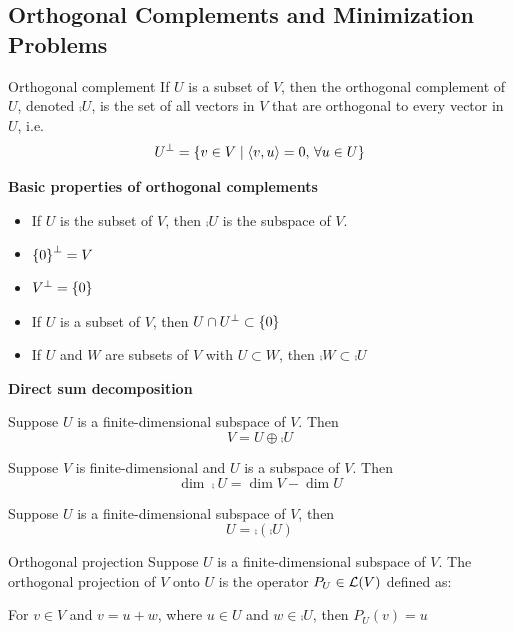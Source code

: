 \documentclass[12pt,a4paper]{article}
\begin{document}
    \subsection{Orthogonal Complements and Minimization Problems}
    \begin{defi}{Orthogonal complement}%
        If $U$ is a subset of $V$, then the orthogonal complement of $U$, denoted $\comp{U}$, is the set of all vectors in $V$ that are orthogonal to every vector in $U$, i.e.
        $$
        U^{\perp}=\left\{v\in V\mid\langle v,u\rangle=0,\,\forall u\in U\right\}
        $$
    \end{defi}
    \hfill

    \begin{prop}
        \textbf{Basic properties of orthogonal complements}
        \begin{itemize}
            \item If $U$ is the subset of $V$, then $\comp{U}$ is the subspace of $V$.
            \item $\left\{0\right\}^{\perp}=V$
            \item $V^{\perp}=\left\{0\right\}$
            \item If $U$ is a subset of $V$, then $U\cap U^{\perp}\subset\left\{0\right\}$
            \item If $U$ and $W$ are subsets of $V$ with $U\subset W$, then $\comp{W}\subset{\comp{U}}$
        \end{itemize}
    \end{prop}
    \hfill

    \begin{prop}
        \textbf{Direct sum decomposition}

        Suppose $U$ is a finite-dimensional subspace of $V$. Then
        $$
        V=U\oplus\comp{U}
        $$
    \end{prop}
    \hfill

    \begin{prop}\label{6.29}
        Suppose $V$ is finite-dimensional and $U$ is a subspace of $V$. Then 
        $$
        \dim\comp{U}=\dim V-\dim U
        $$
    \end{prop}
    \hfill

    \begin{prop}
        Suppose $U$ is a finite-dimensional subspace of $V$, then
        $$
        U=\comp{(\comp{U})}
        $$
    \end{prop}
    \hfill

    \begin{defi}{Orthogonal projection}%
        Suppose $U$ is a finite-dimensional subspace of $V$. The orthogonal projection of $V$ onto $U$ is the operator $P_{U}\in\mathcal{L}(V)$ defined as:

        For $v\in V$ and $v=u+w$, where $u\in U$ and $w\in\comp{U}$, then $P_{U}(v)=u$
    \end{defi}
    \hfill
\end{document}
